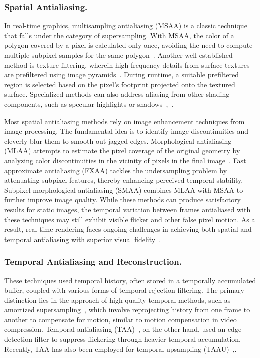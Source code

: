 \subsubsection{Spatial Antialiasing.}
In real-time graphics, multisampling antialiasing (MSAA) is a classic technique that falls under the category of supersampling. With MSAA, the color of a polygon covered by a pixel is calculated only once, avoiding the need to compute multiple subpixel samples for the same polygon~\cite{akeley1993reality}. Another well-established method is texture filtering, wherein high-frequency details from surface textures are prefiltered using image pyramids~\cite{williams1983pyramidal}. During runtime, a suitable prefiltered region is selected based on the pixel's footprint projected onto the textured surface. Specialized methods can also address aliasing from other shading components, such as specular highlights or shadows~\cite{kaplanyan2016filtering},~\cite{reeves1987rendering}.

Most spatial antialiasing methods rely on image enhancement techniques from image processing. The fundamental idea is to identify image discontinuities and cleverly blur them to smooth out jagged edges. Morphological antialiasing (MLAA) attempts to estimate the pixel coverage of the original geometry by analyzing color discontinuities in the vicinity of pixels in the final image~\cite{reshetov2009morphological}. Fast approximate antialiasing (FXAA) tackles the undersampling problem by attenuating subpixel features, thereby enhancing perceived temporal stability. Subpixel morphological antialiasing (SMAA) combines MLAA with MSAA to further improve image quality. While these methods can produce satisfactory results for static images, the temporal variation between frames antialiased with these techniques may still exhibit visible flicker and other false pixel motion. As a result, real-time rendering faces ongoing challenges in achieving both spatial and temporal antialiasing with superior visual fidelity~\cite{jimenez2012smaa}.

\subsubsection{Temporal Antialiasing and Reconstruction.}
These techniques used temporal history, often stored in a temporally accumulated buffer, coupled with various forms of temporal rejection filtering. The primary distinction lies in the approach of high-quality temporal methods, such as amortized supersampling~\cite{yang2009amortized}, which involve reprojecting history from one frame to another to compensate for motion, similar to motion compensation in video compression. Temporal antialiasing (TAA)~\cite{karis2014high}, on the other hand, used an edge detection filter to suppress flickering through heavier temporal accumulation. Recently, TAA has also been employed for temporal upsampling (TAAU)~\cite{osman2021design},.

